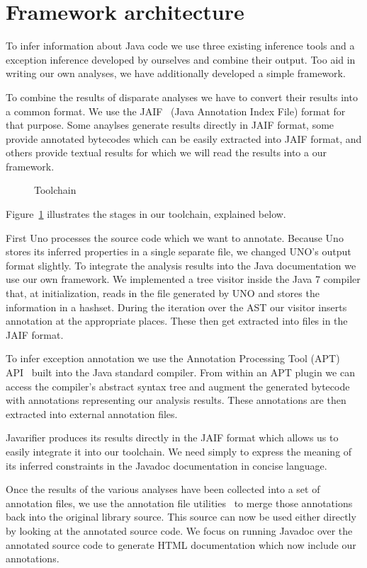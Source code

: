 \section{Framework architecture}
To infer information about Java code we use three existing inference tools and 
a exception inference developed by ourselves and combine their output. 
Too aid in writing our own analyses, we have additionally developed a simple 
framework. 

To combine the results of disparate analyses we have to convert their results
into a common format.  We use the JAIF~\cite{JAIF}
(Java Annotation Index File) format for that purpose.  Some anaylses generate
results directly in JAIF format, some provide annotated bytecodes which can be
easily extracted into JAIF format, and others provide textual results for which
we will read the results into a our framework.

\begin{figure}
\centering
{}
\caption{Toolchain}
\label{fig:toolchain}
\end{figure}

Figure~\ref{fig:toolchain} 
illustrates the stages in our toolchain, explained below.

First Uno processes the source code which we want to annotate. 
Because Uno stores its inferred properties in a single separate file, 
we changed UNO's output format slightly.
To integrate the analysis results into the Java documentation we
use our own framework. We implemented a tree visitor inside the Java 7 
compiler that, at initialization, reads in the file generated by UNO and 
stores the information in a hashset. During the iteration over the AST
our visitor inserts annotation at the appropriate places. These then
get extracted into files in the JAIF format.

To infer exception annotation we use the Annotation Processing Tool (APT)
API~\cite{apt} built into the Java standard compiler.
From within an APT plugin
we can access the compiler's abstract syntax tree and augment the generated
bytecode with annotations representing our analysis results. These annotations
are then extracted into external annotation files.

Javarifier produces its results directly in the JAIF format which allows us to
easily integrate it into our toolchain. We need simply to express the meaning
of its inferred constraints in the Javadoc documentation in concise language.

Once the results of the various analyses have been collected into a set of
annotation files, we use the annotation file utilities~\cite{AFU} to merge
those annotations back into the original library source. This source
can now be used either directly by looking at the annotated source code. We
focus on running Javadoc over the annotated source code to generate HTML documentation
which now include our annotations.
